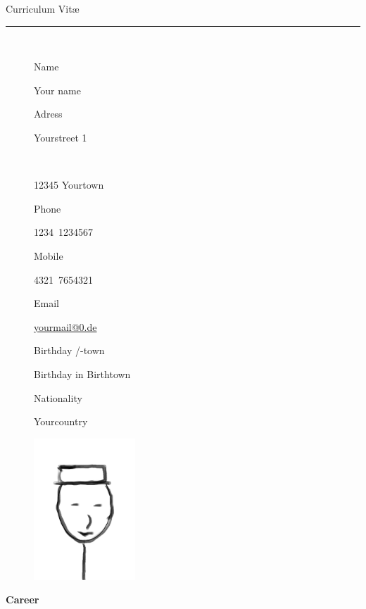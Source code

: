 \documentclass{scrartcl}
\date{}
\newcommand{\colorOne}{mycolor}
\newlength{\boxA}\settowidth{\boxA}{Geburtsdatum und ort}
\newlength{\boxB}\settowidth{\boxB}{So lange muss diese Zeile sein oder sogar länger, mal gucken noch}
\newcommand{\NewData}[2]{\noindent \parbox{\boxA}{#1}\hspace{1em}#2\vspace{0.5em}}
\newcommand{\NewEntry}[2]{\noindent \parbox[t]{\boxA}{#1}\hspace{1em}\parbox[t]{\boxB}{#2}}
\begin{document}
    \pagestyle{empty}
    \noindent \textcolor{\colorOne}{\Large Curriculum Vit\ae}\vspace{-0.27em}
    \\
    {\rule{\textwidth}{0.04em}
    \\ \vspace{-1.3em}
    \begin{figure}[htbp]
        \begin{minipage}{0.7\textwidth}
            \NewData{Name}{Your name}
            
            \NewData{Adress}{Yourstreet 1\\ \hspace{0.5em} \parbox{\boxA}{~}\hspace{1em}12345 Yourtown}
            
            \NewData{Phone}{1234~1234567}
            
            \NewData{Mobile}{4321~7654321}
            
            \NewData{Email}{\href{mailto:yourmail@0.de}{yourmail@0.de}}
            
            \NewData{Birthday /-town}{Birthday in Birthtown}
            
            
            \NewData{Nationality}{Yourcountry}
            
        \end{minipage}
        \hspace{2.2em}
        \begin{minipage}{0.2\textwidth}
            \centering
            \includegraphics[width=38mm]{photoA.jpg}
        \end{minipage}
    \end{figure}

\vspace{1em}

\NewEntry{\textcolor{\colorOne}{\textbf{Career}}}{~}

}
\end{document}
